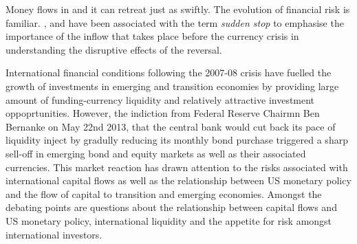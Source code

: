 \documentclass[12pt, a4paper, oneside]{article} %
\begin{document}
Money flows in and it can retreat just as swiftly.  The evolution of financial risk is familiar. \citet{DornbuschSS}, \citet{CalvoSS} and \citet{KrugmanSS} have been associated with the term \emph{sudden stop} to emphasise the importance of the inflow that takes place before the currency crisis in understanding the disruptive effects of the reversal.   




International financial conditions following the 2007-08 crisis have fuelled the growth of investments in emerging and transition economies by providing large amount of funding-currency liquidity and relatively attractive investment oppoprtunities. However, the indiction from Federal Reserve Chairmn Ben Bernanke on May 22nd 2013, that the central bank would cut back its pace of liquidity inject by gradully reducing its monthly bond purchase triggered a sharp sell-off in emerging bond and equity markets as well as their associated currencies.  This market reaction has drawn attention to the risks associated with international capital flows  as well as the relationship between US monetary policy and the flow of capital to transition and emerging economies.  Amongst the debating points are questions about the relationship between capital flows and US monetary policy, international liquidity and the appetite for risk amongst international investors. 
\end{document}

